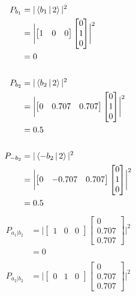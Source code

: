 \documentclass[12pt]{article}
\begin{document}
\problemasub
\begin{align*}
    P_{b_1} &= |\Braket{b_1|2}|^2 \\
            &= \biggl|\begin{bmatrix}1&0&0\end{bmatrix}\begin{bmatrix}0\\1\\0\end{bmatrix}\biggr|^2 \\
            &= 0 \\ \\
    P_{b_2} &= |\Braket{b_2|2}|^2 \\
            &= \biggl|\begin{bmatrix}0&0.707&0.707\end{bmatrix}\begin{bmatrix}0\\1\\0\end{bmatrix}\biggr|^2 \\
            &= 0.5 \\ \\
    P_{-b_2} &= |\Braket{-b_2|2}|^2 \\
            &= \biggl|\begin{bmatrix}0&-0.707&0.707\end{bmatrix}\begin{bmatrix}0\\1\\0\end{bmatrix}\biggr|^2 \\
            &= 0.5
\end{align*}\begin{align*}
    P_{a_1|b_2} &= \biggl|\begin{bmatrix}1&0&0\end{bmatrix}\begin{bmatrix}0\\0.707\\0.707\end{bmatrix}\biggr|^2 \\
                &= 0 \\ \\
    P_{a_2|b_2} &= \biggl|\begin{bmatrix}0&1&0\end{bmatrix}\begin{bmatrix}0\\0.707\\0.707\end{bmatrix}\biggr|^2 \\

\end{align*}
\end{document}

